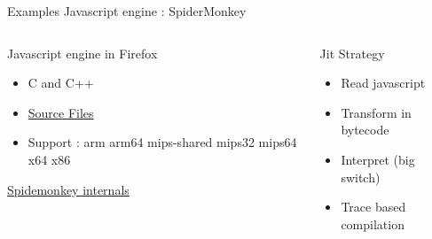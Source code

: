 %
\begin{Frame}{Examples Javascript engine : SpiderMonkey}
  \begin{columns}[t]
    \begin{column}{5cm} %
      \begin{block}{Javascript engine in Firefox}
        \begin{itemize}
        \item C and C++
        \item
          \href{https://hg.mozilla.org/mozilla-central/file/tip/js/src}{Source
            Files}
        \item Support : arm arm64 mips-shared mips32 mips64 x64 x86
        \end{itemize}
      \end{block} 
      \href{https://developer.mozilla.org/en-US/docs/Mozilla/Projects/SpiderMonkey/Internals}{Spidemonkey  internals}
    \end{column}
    
    \begin{column}{5cm} %
      \begin{block}{Jit Strategy}
        \begin{itemize}
        \item Read javascript
        \item Transform in bytecode
        \item Interpret (big switch)
        \item Trace based compilation
        \end{itemize}
      \end{block}   
    \end{column}
  \end{columns}  
\end{Frame}


